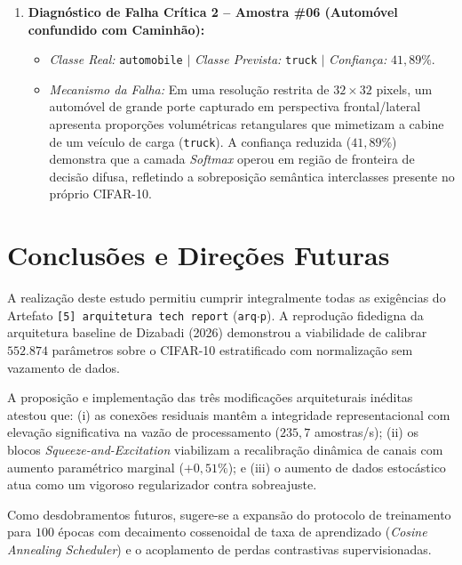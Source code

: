 \documentclass[runningheads]{llncs}
\begin{document}
\begin{enumerate}
    \item \textbf{Diagn\'{o}stico de Falha Cr\'{i}tica 2 -- Amostra \#06 (Autom\'{o}vel confundido com Caminh\~{a}o):}
    \begin{itemize}
        \item \textit{Classe Real:} \texttt{automobile} $\mid$ \textit{Classe Prevista:} \texttt{truck} $\mid$ \textit{Confian\c{c}a:} \textbf{$41{,}89\%$}.
        \item \textit{Mecanismo da Falha:} Em uma resolu\c{c}\~{a}o restrita de $32 \times 32$ pixels, um autom\'{o}vel de grande porte capturado em perspectiva frontal/lateral apresenta propor\c{c}\~{o}es volum\'{e}tricas retangulares que mimetizam a cabine de um ve\'{i}culo de carga (\texttt{truck}). A confian\c{c}a reduzida ($41{,}89\%$) demonstra que a camada \textit{Softmax} operou em regi\~{a}o de fronteira de decis\~{a}o difusa, refletindo a sobreposi\c{c}\~{a}o sem\^{a}ntica interclasses presente no pr\'{o}prio CIFAR-10.
    \end{itemize}
\end{enumerate}

\section{Conclus\~{o}es e Dire\c{c}\~{o}es Futuras}
\label{sec:conclusao}
A realiza\c{c}\~{a}o deste estudo permitiu cumprir integralmente todas as exig\^{e}ncias do Artefato \texttt{[5] arquitetura tech report} (\texttt{arq$\cdot$p}). A reprodu\c{c}\~{a}o fidedigna da arquitetura baseline de Dizabadi (2026) demonstrou a viabilidade de calibrar $552.874$ par\^{a}metros sobre o CIFAR-10 estratificado com normaliza\c{c}\~{a}o sem vazamento de dados. 

A proposi\c{c}\~{a}o e implementa\c{c}\~{a}o das tr\^{e}s modifica\c{c}\~{o}es arquiteturais in\'{e}ditas atestou que: (i) as conex\~{o}es residuais mant\^{e}m a integridade representacional com eleva\c{c}\~{a}o significativa na vaz\~{a}o de processamento ($235{,}7$ amostras/s); (ii) os blocos \textit{Squeeze-and-Excitation} viabilizam a recalibra\c{c}\~{a}o din\^{a}mica de canais com aumento param\'{e}trico marginal ($+0{,}51\%$); e (iii) o aumento de dados estoc\'{a}stico atua como um vigoroso regularizador contra sobreajuste.

Como desdobramentos futuros, sugere-se a expans\~{a}o do protocolo de treinamento para $100$ \'{e}pocas com decaimento cossenoidal de taxa de aprendizado (\textit{Cosine Annealing Scheduler}) e o acoplamento de perdas contrastivas supervisionadas.



\end{document}
